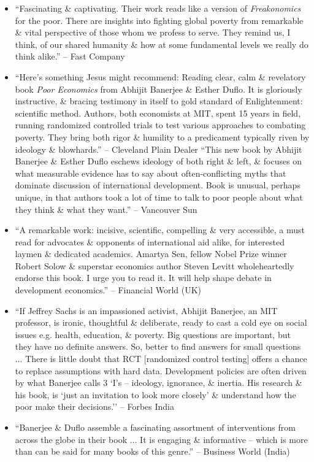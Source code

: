 \documentclass{article}
\begin{document}
\begin{enumerate}
\begin{itemize}
		\item ``Fascinating \& captivating. Their work reads like a version of {\it Freakonomics} for the poor. There are insights into fighting global poverty from remarkable \& vital perspective of those whom we profess to serve. They remind us, I think, of our shared humanity \& how at some fundamental levels we really do think alike.'' -- Fast Company
		\item ``Here's something Jesus might recommend: Reading clear, calm \& revelatory book {\it Poor Economics} from {\sc Abhijit Banerjee \& Esther Duflo}. It is gloriously instructive, \& bracing testimony in itself to gold standard of Enlightenment: scientific method. Authors, both economists at MIT, spent 15 years in field, running randomized controlled trials to test various approaches to combating poverty. They bring both rigor \& humility to a predicament typically riven by ideology \& blowhards.'' -- Cleveland Plain Dealer
		``This new book by {\sc Abhijit Banerjee \& Esther Duflo} eschews ideology of both right \& left, \& focuses on what measurable evidence has to say about often-conflicting myths that dominate discussion of international development. Book is unusual, perhaps unique, in that authors took a lot of time to talk to poor people about what they think \& what they want.'' -- Vancouver Sun
		\item ``A remarkable work: incisive, scientific, compelling \& very accessible, a must read for advocates \& opponents of international aid alike, for interested laymen \& dedicated academics. {\sc Amartya Sen}, fellow Nobel Prize winner Robert Solow \& superstar economics author {\sc Steven Levitt} wholeheartedly endorse this book. I urge you to read it. It will help shape debate in development economics.'' -- Financial World (UK)
		\item ``If {\sc Jeffrey Sachs} is an impassioned activist, {\sc Abhijit Banerjee}, an MIT professor, is ironic, thoughtful \& deliberate, ready to cast a cold eye on social issues e.g. health, education, \& poverty. Big questions are important, but they have no definite answers. So, better to find answers for small questions $\ldots$ There is little doubt that RCT [randomized control testing] offers a  chance to replace assumptions with hard data. Development policies are often driven by what {\sc Banerjee} calls 3 `I's -- ideology, ignorance, \& inertia. His research \& his book, is `just an invitation to look more closely' \& understand how the poor make their decisions.'' -- Forbes India
		\item ``{\sc Banerjee \& Duflo} assemble a fascinating assortment of interventions from across the globe in their book $\ldots$ It is engaging \& informative -- which is more than can be said for many books of this genre.'' -- Business World (India)

\end{itemize}
\end{enumerate}
\end{document}
